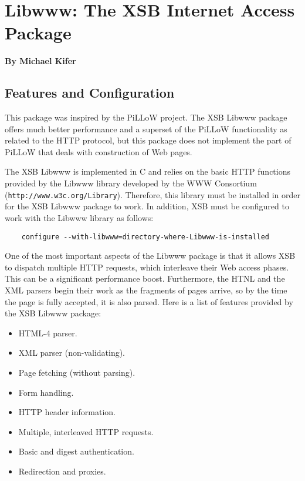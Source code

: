 \chapter{Libwww: The XSB Internet Access Package}
\label{chap-libwww}

\begin{center}
{\Large {\bf By Michael Kifer}}
\end{center}


\section{Features and Configuration}
This package was inspired by the PiLLoW project.
The XSB Libwww package offers much better performance and a superset of the
PiLLoW functionality as related to the HTTP protocol, but this package does
not implement the part of PiLLoW that deals with construction of Web pages.

The XSB Libwww is implemented in C and relies on the basic HTTP functions
provided by the Libwww library developed by the WWW Consortium
(\verb|http://www.w3c.org/Library|). Therefore, this library must be
installed in order for the XSB Libwww package to work. In addition, XSB
must be configured to work with the Libwww library as follows:
\begin{verbatim}
    configure --with-libwww=directory-where-Libwww-is-installed  
\end{verbatim}

One of the most important aspects of the Libwww package is that it allows
XSB to dispatch multiple HTTP requests, which interleave their Web access
phases. This can be a significant performance boost. Furthermore, the HTNL
and the XML parsers begin their work as the fragments of pages arrive, so
by the time the page is fully accepted, it is also parsed. Here is a list
of features provided by the XSB Libwww package:
\begin{itemize}
  \item  HTML-4 parser.
  \item  XML parser (non-validating).
  \item  Page fetching (without parsing).
  \item  Form handling.
  \item  HTTP header information.
  \item  Multiple, interleaved HTTP requests.
  \item  Basic and digest authentication.
  \item  Redirection and proxies.
\end{itemize}

